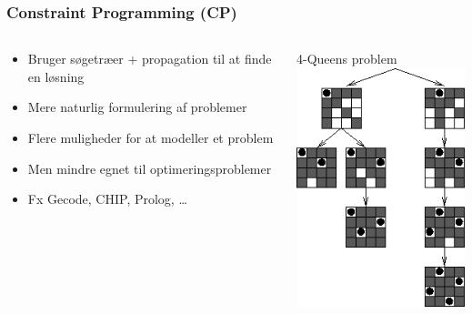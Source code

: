 \documentclass[smaller,handouts]{beamer}
\begin{document}
\begin{frame}
\frametitle{Constraint Programming (CP)}
\begin{columns}[T]
    \begin{column}[T]{.52\textwidth}
    \vspace{0.1cm}
    \begin{itemize}[<+->]
\item Bruger søgetræer + propagation til at finde en løsning
\item Mere naturlig formulering af problemer
\item Flere muligheder for at modeller et problem
\item \alert{Men mindre egnet til optimeringsproblemer}
\item Fx Gecode, CHIP, Prolog, \dots
\end{itemize}
\end{column} 
\begin{column}[T]{.5\textwidth} \vfill
\begin{center}
4-Queens problem \\
\includegraphics[scale=0.5]{cp.png}
\end{center}
\end{column}
\end{columns}
\end{frame}
\end{document}
